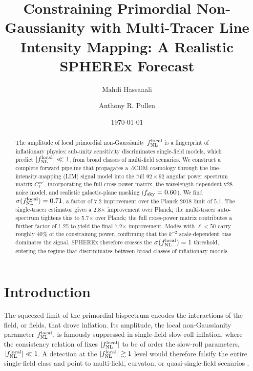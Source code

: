 \documentclass[twocolumn,prd,nofootinbib,superscriptaddress,floatfix,11pt]{revtex4-2}
\begin{document}
\title{Constraining Primordial Non-Gaussianity with Multi-Tracer Line Intensity Mapping: A Realistic SPHEREx Forecast}

\author{Mahdi Hassanali}

\author{Anthony R. Pullen}

\date{\today}

\begin{abstract}
The amplitude of local primordial non-Gaussianity $f_{\rm NL}^{\rm local}$ is a fingerprint of inflationary physics: sub-unity sensitivity discriminates single-field models, which predict $|f_{\rm NL}^{\rm local}| \ll 1$, from broad classes of multi-field scenarios.  We construct a complete forward pipeline that propagates a $\Lambda$CDM cosmology through the line-intensity-mapping (LIM) signal model into the full $92\times 92$ angular power spectrum matrix $C_\ell^{\nu\nu'}$, incorporating the full cross-power matrix, the wavelength-dependent v28 noise model, and realistic galactic-plane masking ($f_{\rm sky}=0.60$).  We find $\sigma(f_{\rm NL}^{\rm local}) = 0.71$, a factor of $7.2$ improvement over the Planck 2018 limit of $5.1$.  The single-tracer estimator gives a 2.8$\times$ improvement over Planck; the multi-tracer auto-spectrum tightens this to 5.7$\times$ over Planck; the full cross-power matrix contributes a further factor of 1.25 to yield the final 7.2$\times$ improvement.  Modes with $\ell < 50$ carry roughly $40\%$ of the constraining power, confirming that the $k^{-2}$ scale-dependent bias dominates the signal.  SPHEREx therefore crosses the $\sigma(f_{\rm NL}^{\rm local}) = 1$ threshold, entering the regime that discriminates between broad classes of inflationary models.
\end{abstract}

\maketitle

\section{Introduction}
\label{sec:intro}

The squeezed limit of the primordial bispectrum encodes the interactions of the field, or fields, that drove inflation.  Its amplitude, the local non-Gaussianity parameter $f_{\rm NL}^{\rm local}$, is famously suppressed in single-field slow-roll inflation, where the consistency relation of \citet{Maldacena2003} fixes $|f_{\rm NL}^{\rm local}|$ to be of order the slow-roll parameters, $|f_{\rm NL}^{\rm local}| \ll 1$.  A detection at the $|f_{\rm NL}^{\rm local}| \gtrsim 1$ level would therefore falsify the entire single-field class and point to multi-field, curvaton, or quasi-single-field scenarios \citep{Komatsu2001}.
\end{document}

